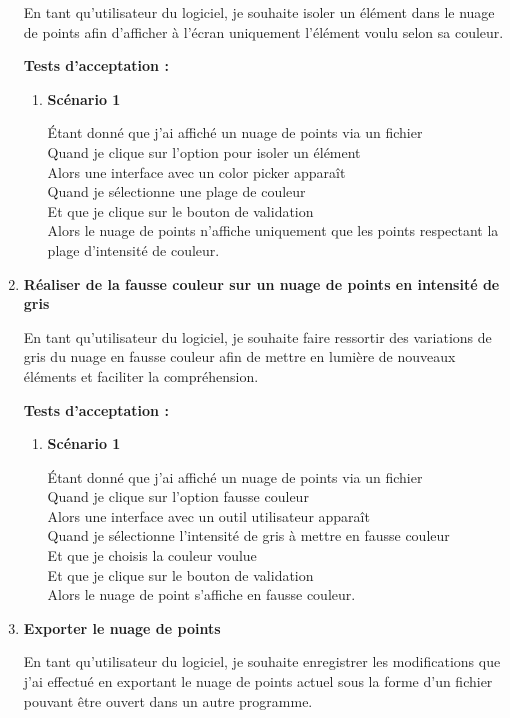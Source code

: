 \documentclass[12pt,titlepage,french]{article}
\begin{document}
\begin{enumerate}
En tant qu'utilisateur du logiciel, je souhaite isoler un élément dans le nuage de points afin d'afficher à l'écran uniquement l'élément voulu selon sa couleur.

\textbf{Tests d'acceptation :}

\begin{enumerate}
    \item \textbf{Scénario 1}

Étant donné que j'ai affiché un nuage de points via un fichier\\
Quand je clique sur l'option pour isoler un élément\\
Alors une interface avec un color picker apparaît\\
Quand je sélectionne une plage de couleur\\
Et que je clique sur le bouton de validation\\
Alors le nuage de points n'affiche uniquement que les points respectant la plage d'intensité de couleur.

\end{enumerate}
\item \textbf{Réaliser de la fausse couleur sur un nuage de points en intensité de gris}

En tant qu'utilisateur du logiciel, je souhaite faire ressortir des variations de gris du nuage en fausse couleur afin de mettre en lumière de nouveaux éléments et faciliter la compréhension.

\textbf{Tests d'acceptation :}

\begin{enumerate}
    \item \textbf{Scénario 1}

Étant donné que j'ai affiché un nuage de points via un fichier\\
Quand je clique sur l'option fausse couleur\\
Alors une interface avec un outil utilisateur apparaît\\
Quand je sélectionne l'intensité de gris à mettre en fausse couleur\\
Et que je choisis la couleur voulue\\
Et que je clique sur le bouton de validation\\
Alors le nuage de point s'affiche en fausse couleur.
\end{enumerate}

\item \textbf{Exporter le nuage de points}

En tant qu'utilisateur du logiciel, je souhaite enregistrer les modifications que j'ai effectué en exportant le nuage de points actuel sous la forme d'un fichier pouvant être ouvert dans un autre programme.


\end{enumerate}
\end{document}
